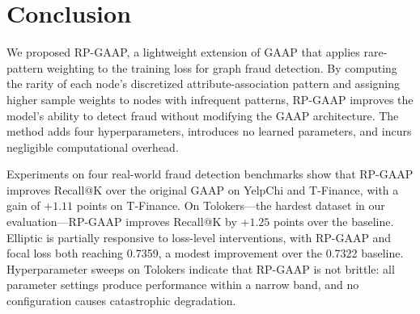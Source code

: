 \section{Conclusion}
\label{sec:conclusion}

We proposed RP-GAAP, a lightweight extension of GAAP that applies rare-pattern weighting to the training loss for graph fraud detection. By computing the rarity of each node's discretized attribute-association pattern and assigning higher sample weights to nodes with infrequent patterns, RP-GAAP improves the model's ability to detect fraud without modifying the GAAP architecture. The method adds four hyperparameters, introduces no learned parameters, and incurs negligible computational overhead.

Experiments on four real-world fraud detection benchmarks show that RP-GAAP improves Recall@K over the original GAAP on YelpChi and T-Finance, with a gain of $+1.11$ points on T-Finance. On Tolokers---the hardest dataset in our evaluation---RP-GAAP improves Recall@K by $+1.25$ points over the baseline. Elliptic is partially responsive to loss-level interventions, with RP-GAAP and focal loss both reaching 0.7359, a modest improvement over the 0.7322 baseline. Hyperparameter sweeps on Tolokers indicate that RP-GAAP is not brittle: all parameter settings produce performance within a narrow band, and no configuration causes catastrophic degradation.
